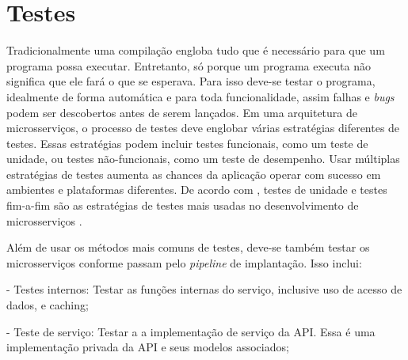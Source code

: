 
\section{Testes}

Tradicionalmente uma compilação engloba tudo que é necessário para que um programa possa executar. Entretanto, só porque um programa executa não significa que ele fará o que se esperava. Para isso deve-se testar o programa, idealmente de forma automática e para toda funcionalidade, assim falhas e \emph{bugs} podem ser descobertos antes de serem lançados. Em uma arquitetura de microsserviços, o processo de testes deve englobar várias estratégias diferentes de testes. Essas estratégias podem incluir testes funcionais, como um teste de unidade, ou testes não-funcionais, como um teste de desempenho. Usar múltiplas estratégias de testes aumenta as chances da aplicação operar com sucesso em ambientes e plataformas diferentes. De acordo com , testes de unidade e testes fim-a-fim são as estratégias de testes mais usadas no desenvolvimento de microsserviços \cite{martin-fowler-continuous-integration,Familiar2015}.


Além de usar os métodos mais comuns de testes, deve-se também testar os microsserviços conforme passam pelo \emph{pipeline} de implantação. Isso inclui: \cite{Familiar2015}

- Testes internos: Testar as funções internas do serviço, inclusive uso de acesso de dados, e caching;

- Teste de serviço: Testar a a implementação de serviço da API. Essa é uma implementação privada da API e seus modelos associados;

